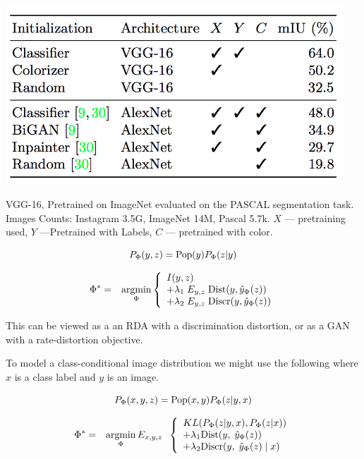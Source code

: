 {

\centerline{\includegraphics[width = 5in]{../images/LearnRepColorc}}
VGG-16, Pretrained on ImageNet evaluated on the PASCAL segmentation task.
Images Counts: {\color{red} Instagram 3.5G, ImageNet 14M, Pascal 5.7k}.
$X$ --- pretraining used, $Y$ ---Pretrained with Labels, $C$ --- pretrained with color.


{\color{red} $$P_\Phi(y,z) = \mathrm{Pop}(y)P_\Phi(z|y)$$}

\begin{eqnarray*}
\Phi^* & =  & \operatorname*{argmin}_\Phi \left\{\begin{array}{l} I(y,z) \\
+ \lambda_1\;E_{y,z}\;\mathrm{Dist}(y,\hat{y}_\Phi(z)) \\
+ \lambda_2 \;E_{y,z}\;\mathrm{Discr}(y,\hat{y}_\Phi(z))\end{array}\right.
\end{eqnarray*}

\vfill
This can be viewed as a an RDA with a discrimination distortion, or as a GAN with a rate-distortion objective.



\vfill
To model a class-conditional image distribution we might use the following where $x$ is a class label and $y$ is an image.

{\color{red} $$P_\Phi(x,y,z) = \mathrm{Pop}(x,y)P_\Phi(z|y,x)$$}

\begin{eqnarray*}
\Phi^* & =  & \operatorname*{argmin}_\Phi E_{x,y,z}\;\;\left\{\begin{array}{l} KL(P_\Phi(z|y,x),P_\Phi(z|x)) \\
+ \lambda_1\mathrm{Dist}(y,\;\hat{y}_\Phi(z)) \\
+ \lambda_2 \mathrm{Discr}(y,\;\hat{y}_\Phi(z)\;|\;x)\end{array}\right.
\end{eqnarray*}


}
